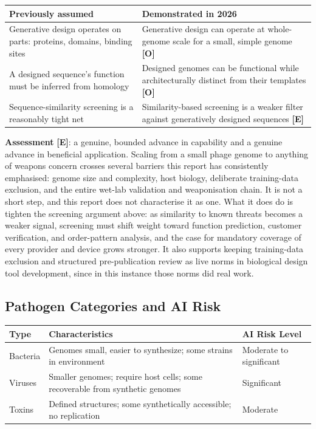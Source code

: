 \documentclass[11pt,letterpaper]{article}
\begin{document}
\begin{center}
\small
\begin{tabular}{L{6.5cm}L{8cm}}
\toprule
\textbf{Previously assumed} & \textbf{Demonstrated in 2026} \\
\midrule
Generative design operates on parts: proteins, domains, binding sites & Generative design can operate at whole-genome scale for a small, simple genome \textbf{[O]} \\
A designed sequence's function must be inferred from homology & Designed genomes can be functional while architecturally distinct from their templates \textbf{[O]} \\
Sequence-similarity screening is a reasonably tight net & Similarity-based screening is a weaker filter against generatively designed sequences \textbf{[E]} \\
\bottomrule
\end{tabular}
\end{center}

\textbf{Assessment} \textbf{[E]}: a genuine, bounded advance in capability and a genuine advance in beneficial application. Scaling from a small phage genome to anything of weapons concern crosses several barriers this report has consistently emphasised: genome size and complexity, host biology, deliberate training-data exclusion, and the entire wet-lab validation and weaponisation chain. It is not a short step, and this report does not characterise it as one. What it does do is tighten the screening argument above: as similarity to known threats becomes a weaker signal, screening must shift weight toward function prediction, customer verification, and order-pattern analysis, and the case for mandatory coverage of every provider and device grows stronger. It also supports keeping training-data exclusion and structured pre-publication review as live norms in biological design tool development, since in this instance those norms did real work.

\subsection{Pathogen Categories and AI Risk}

\begin{center}
\small
\begin{tabular}{L{3cm}L{5.5cm}L{3.5cm}}
\toprule
\textbf{Type} & \textbf{Characteristics} & \textbf{AI Risk Level} \\
\midrule
Bacteria & Genomes small, easier to synthesize; some strains in environment & Moderate to significant \\
Viruses & Smaller genomes; require host cells; some recoverable from synthetic genomes & Significant \\
Toxins & Defined structures; some synthetically accessible; no replication & Moderate \\
\bottomrule
\end{tabular}
\end{center}
\end{document}

